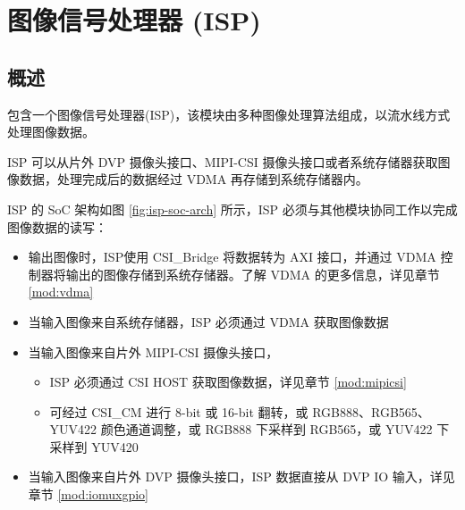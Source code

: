 \documentclass[main\_\_CN.tex]{subfiles}
\begin{document}

\ifglobal
\else
    {\let\clearpage\relax \listoftodos}
    {\let\clearpage\relax \listofdonetodos}
    \tableofcontents
\fi



\hypertarget{isp}{}
\chapter{图像信号处理器 (ISP)}
\label{mod:isp}



\section{概述}

\chipseries{} 包含一个图像信号处理器(ISP)，该模块由多种图像处理算法组成，以流水线方式处理图像数据。

ISP 可以从片外 DVP 摄像头接口、MIPI-CSI 摄像头接口或者系统存储器获取图像数据，处理完成后的数据经过 VDMA 再存储到系统存储器内。

ISP 的 SoC 架构如图 \ref{fig:isp-soc-arch} 所示，ISP 必须与其他模块协同工作以完成图像数据的读写：
\begin{itemize}
    \item 输出图像时，ISP使用 CSI\_Bridge 将数据转为 AXI 接口，并通过 VDMA 控制器将输出的图像存储到系统存储器。了解 VDMA 的更多信息，详见章节 \ref{mod:vdma} \textit{}
    \item 当输入图像来自系统存储器，ISP 必须通过 VDMA 获取图像数据
    \item 当输入图像来自片外 MIPI-CSI 摄像头接口，
    \begin{itemize}
        \item ISP 必须通过 CSI HOST 获取图像数据，详见章节 \ref{mod:mipicsi} \textit{}
        \item 可经过 CSI\_CM 进行 8-bit 或 16-bit 翻转，或 RGB888、RGB565、YUV422 颜色通道调整，或 RGB888 下采样到 RGB565，或 YUV422 下采样到 YUV420
    \end{itemize}
    \item 当输入图像来自片外 DVP 摄像头接口，ISP 数据直接从 DVP IO 输入，详见章节 \ref{mod:iomuxgpio} \textit{}
\end{itemize}
\end{document}
